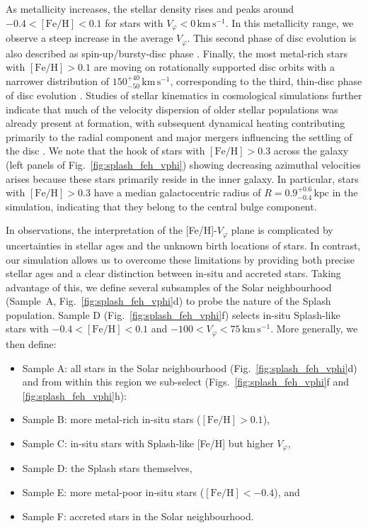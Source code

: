 \documentclass[fleqn,usenatbib]{mnras}
\begin{document}
As metallicity increases, the stellar density rises and peaks around $-0.4 < \mathrm{[Fe/H]} < 0.1$ for stars with $V_\varphi < 0\,\mathrm{km\,s^{-1}}$. In this metallicity range, we observe a steep increase in the average $V_\varphi$. This second phase of disc evolution \citep{Chandra2024} is also described as spin-up/bursty-disc phase  \citep{Yu2023b, Viswanathan2025b}. Finally, the most metal-rich stars with $\mathrm{[Fe/H]} > 0.1$ are moving on rotationally supported disc orbits with a narrower distribution of $150_{-50}^{+40}\,\mathrm{km\,s^{-1}}$, corresponding to the third, thin-disc phase of disc evolution \citep{Yu2023b, Chandra2024}. Studies of stellar kinematics in cosmological simulations further indicate that much of the velocity dispersion of older stellar populations was already present at formation, with subsequent dynamical heating contributing primarily to the radial component and major mergers influencing the settling of the disc \citep{McCluskey2024}. We note that the hook of stars with $\mathrm{[Fe/H]} > 0.3$ across the galaxy (left panels of Fig.~\ref{fig:splash_feh_vphi}) showing decreasing azimuthal velocities arises because these stars primarily reside in the inner galaxy. In particular, stars with $\mathrm{[Fe/H]} > 0.3$ have a median galactocentric radius of $R = 0.9_{-0.4}^{+0.6}\,\mathrm{kpc}$ in the simulation, indicating that they belong to the central bulge component.

In observations, the interpretation of the [Fe/H]-$V_\varphi$ plane is complicated by uncertainties in stellar ages and the unknown birth locations of stars. In contrast, our simulation allows us to overcome these limitations by providing both precise stellar ages and a clear distinction between in-situ and accreted stars. Taking advantage of this, we define several subsamples of the Solar neighbourhood (Sample~A, Fig.~\ref{fig:splash_feh_vphi}d) to probe the nature of the Splash population. Sample D (Fig.~\ref{fig:splash_feh_vphi}f) selects in-situ Splash-like stars with $-0.4 < \mathrm{[Fe/H]} < 0.1$ and $-100 < V_\varphi < 75\,\mathrm{km\,s^{-1}}$.  More generally, we then define:
\begin{itemize}[leftmargin=2em,labelwidth=2em]
    \item Sample A: all stars in the Solar neighbourhood (Fig.~\ref{fig:splash_feh_vphi}d) \\
    and from within this region we sub-select (Figs.~\ref{fig:splash_feh_vphi}f and \ref{fig:splash_feh_vphi}h):
    \item Sample B: more metal-rich in-situ stars ($\mathrm{[Fe/H]} > 0.1$),
    \item Sample C: in-situ stars with Splash-like [Fe/H] but higher $V_\varphi$,
    \item Sample D: the Splash stars themselves,
    \item Sample E: more metal-poor in-situ stars ($\mathrm{[Fe/H]} < -0.4$), and
    \item Sample F: accreted stars in the Solar neighbourhood.
\end{itemize}
\end{document}
